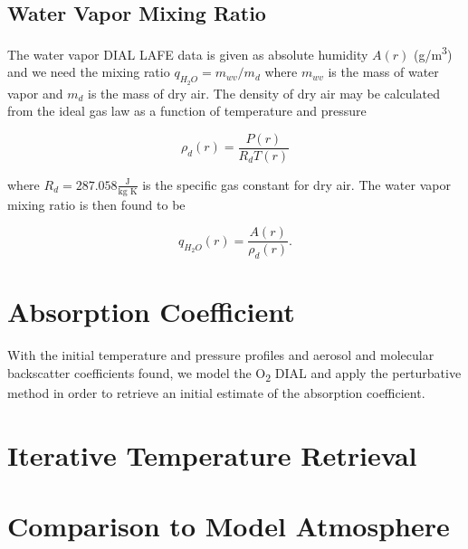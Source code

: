\documentclass[twoside]{article}
\begin{document}
\subsection{Water Vapor Mixing Ratio}

The water vapor DIAL LAFE data is given as absolute humidity $A(r)$ (g/m\textsuperscript{3}) and we need the mixing ratio $q_{H_2O} = m_{wv}/m_d$ where $m_{wv}$ is the mass of water vapor and $m_{d}$ is the mass of dry air.
The density of dry air may be calculated from the ideal gas law as a function of temperature and pressure

\begin{equation}
	\rho_d(r) = \frac{P(r)}{R_d T(r)}
\end{equation}

\noindent where $R_d = 287.058 \frac{\text{J}}{\text{kg K}}$ is the specific gas constant for dry air. The water vapor mixing ratio is then found to be

\begin{equation}
	q_{H_2O}(r) = \frac{A(r)}{\rho_d(r)}.
\end{equation}

\section{Absorption Coefficient}

With the initial temperature and pressure profiles and aerosol and molecular backscatter coefficients found, we model the O\textsubscript{2} DIAL and apply the perturbative method in order to retrieve an initial estimate of the absorption coefficient.

\section{Iterative Temperature Retrieval}

\section{Comparison to Model Atmosphere}
\end{document}
